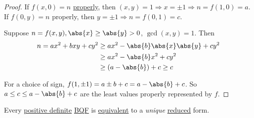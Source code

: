 \documentclass{article}
\begin{document}
\begin{proof}
    If $f(x, 0) = n$ \hyperlink{def:propRep}{properly}, then $(x, y) = 1 \Rightarrow x = \pm 1 \Rightarrow n = f(1, 0) = a$.
    If $f(0, y) = n$ properly, then $y = \pm 1 \Rightarrow n = f(0, 1) = c$.

    Suppose $n = f(x, y), \abs{x} \geq \abs{y} > 0$, $\gcd(x, y) = 1$.  Then
    \begin{align*}
        n = a x^2 + b xy + cy^2 &\geq a x^2 - \abs{b} \abs{x} \abs{y} + c y^2 \\
                                &\geq a x^2 -\abs{b} x^2 + c y^2 \\
                                &\geq (a - \abs{b}) + c \geq c
    \end{align*}

    For a choice of sign, $f(1, \pm1) = a \pm b + c = a - \abs{b} + c$.
    So $a \leq c \leq a - \abs{b} + c$ are the least values properly represented by $f$.
\end{proof}

\begin{nthm}\label{thm:4.8}
    Every \hyperlink{def:definite}{positive definite} \hyperlink{def:bqf}{BQF} is \hyperlink{def:uniSub}{equivalent} to a \emph{unique} \hyperlink{def:reduced}{reduced} form.
\end{nthm}
\end{document}
